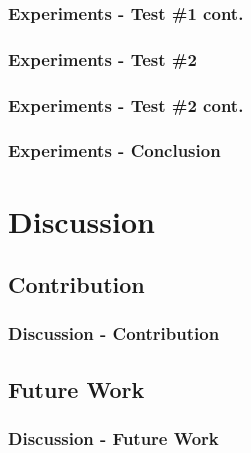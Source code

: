 \documentclass{beamer}
\begin{document}
\begin{frame}
\frametitle{Experiments - Test \#1 cont.}
\end{frame}

\begin{frame}
\frametitle{Experiments - Test \#2}
\end{frame}

\begin{frame}
\frametitle{Experiments - Test \#2 cont.}
\end{frame}

\begin{frame}
\frametitle{Experiments - Conclusion}
\end{frame}

\section{Discussion}

\subsection{Contribution}
\begin{frame}
\frametitle{Discussion - Contribution}
\end{frame}

\subsection{Future Work}
\begin{frame}
\frametitle{Discussion - Future Work}

\end{frame}
\end{document}
